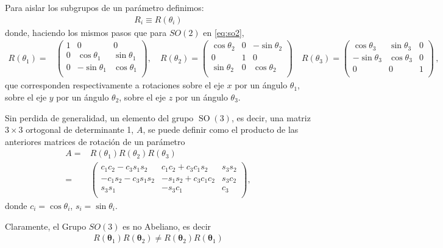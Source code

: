 Para aislar los subgrupos de un parámetro definimos:
\begin{align}
  R_i\equiv R(\theta_i)
\end{align}
donde, haciendo los mismos pasos que para $SO(2)$ en \eqref{eq:so2},
\begin{align}
  R(\theta_1)=&
  \begin{pmatrix}
   1 &   0        &0\\
   0 &\cos\theta_1  & \sin\theta_1\\
   0 & -\sin\theta_1& \cos\theta_1\\
  \end{pmatrix},\quad R(\theta_2)=
  \begin{pmatrix}
     \cos\theta_2 &0& -\sin\theta_2\\
     0          &1& 0          \\
    \sin\theta_2  &0&  \cos\theta_2\\
  \end{pmatrix}\quad R(\theta_3)=
  \begin{pmatrix}
     \cos\theta_3 & \sin\theta_3&0\\
     -\sin\theta_3& \cos\theta_3&0\\
      0         &     0     &1\\
  \end{pmatrix}\,,
\end{align}
que corresponden respectivamente a rotaciones sobre el eje $x$ por un ángulo $\theta_1$, sobre el eje $y$ por un ángulo $\theta_2$, sobre el eje $z$ por un ángulo $\theta_3$.

Sin perdida de generalidad, un elemento del grupo $\operatorname{SO}(3)$, es decir, una matriz $3\times3$ ortogonal de determinante 1, $A$, se puede definir como el producto de las anteriores matrices de rotación de un parámetro
\begin{align}
 A =&R(\theta_1)R(\theta_2)R(\theta_3) \nonumber\\
=&
  \begin{pmatrix}
    c_1 c_2-c_3 s_1 s_2    & c_1 c_2 + c_3 c_1 s_2  & s_3 s_2 \\
    -c_1 s_2 - c_3 s_1 s_2 & -s_1 s_2 + c_3 c_1 c_2 & s_3 c_2 \\
    s_3 s_1               & -s_3 c_1               & c_3\\
  \end{pmatrix},
\end{align}
donde $c_i=\cos \theta_i$,  $s_i=\sin \theta_i$.

Claramente, el Grupo $SO(3)$ es no Abeliano, es decir
\begin{align*}
  R(\boldsymbol{\theta}_1)R(\boldsymbol{\theta}_2)\ne R(\boldsymbol{\theta}_2)R(\boldsymbol{\theta}_1)
\end{align*}

